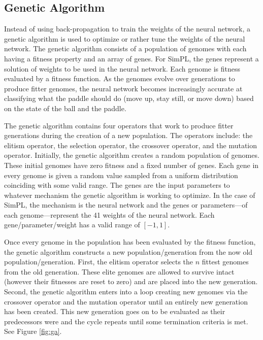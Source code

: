 \documentclass[a4paper,10pt]{article}
\begin{document}
\pagebreak

\subsection{Genetic Algorithm}

Instead of using back-propagation to train the weights of the neural network, a genetic algorithm is used to optimize or rather tune the weights of the neural network. The genetic algorithm consists of a population of genomes with each having a fitness property and an array of genes. For SimPL, the genes represent a solution of weights to be used in the neural network. Each genome is fitness evaluated by a fitness function. As the genomes evolve over generations to produce fitter genomes, the neural network becomes increasingly accurate at classifying what the paddle should do (move up, stay still, or move down) based on the state of the ball and the paddle. 

The genetic algorithm contains four operators that work to produce fitter generations during the creation of a new population. The operators include: the elitism operator, the selection operator, the crossover operator, and the mutation operator. Initially, the genetic algorithm creates a random population of genomes. These initial genomes have zero fitness and a fixed number of genes. Each gene in every genome is given a random value sampled from a uniform distribution coinciding with some valid range. The genes are the input parameters to whatever mechanism the genetic algorithm is working to optimize. In the case of SimPL, the mechanism is the neural network and the genes or parameters---of each genome---represent the 41 weights of the neural network. Each gene/parameter/weight has a valid range of $[-1,1]$. 

Once every genome in the population has been evaluated by the fitness function, the genetic algorithm constructs a new population/generation from the now old population/generation. First, the elitism operator selects the $n$ fittest genomes from the old generation. These elite genomes are allowed to survive intact (however their fitnesses are reset to zero) and are placed into the new generation. Second, the genetic algorithm enters into a loop creating new genomes via the crossover operator and the mutation operator until an entirely new generation has been created. This new generation goes on to be evaluated as their predecessors were and the cycle repeats until some termination criteria is met. See Figure \ref{fig:ga}.
\end{document}
